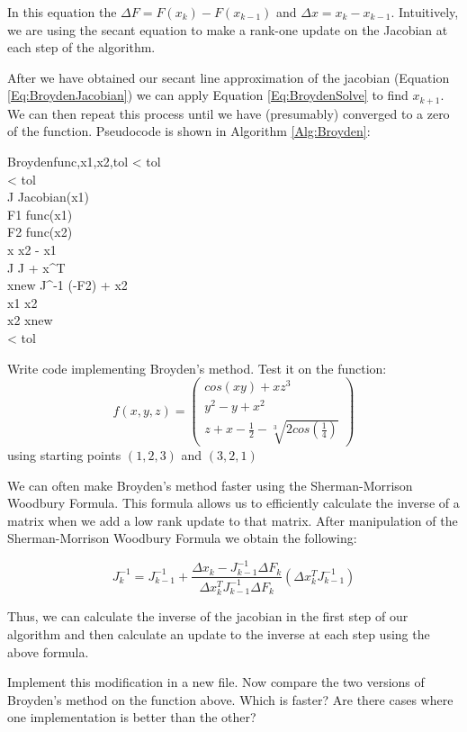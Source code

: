 In this equation the $\Delta F = F(x_k)-F(x_{k-1})$ and $\Delta x = x_k-x_{k-1}$. Intuitively, we are using the secant equation to make a rank-one update on the Jacobian at each step of the algorithm.

After we have obtained our secant line approximation of the jacobian (Equation \ref{Eq:BroydenJacobian}) we can apply Equation \ref{Eq:BroydenSolve} to find $x_{k+1}$. We can then repeat this process until we have (presumably) converged to a zero of the function. Pseudocode is shown in Algorithm \ref{Alg:Broyden}:

\begin{pseudo}{Broyden}{func,x1,x2,tol}
\label{Alg:Broyden}
\IF {} < tol \THEN
    \\
\IF {} < tol \THEN
    \\

J \GETS Jacobian(x1) \\

\REPEAT 
F1 \GETS func(x1) \\
F2 \GETS func(x2) \\
\Delta x \GETS x2 - x1 \\
J \GETS J + \Delta x^T \\
xnew \GETS J^{-1} (-F2) + x2 \\
x1 \GETS x2 \\
x2 \GETS xnew \\
\UNTIL {} < tol \THEN {}
\end{pseudo}

\begin{problem}
Write code implementing Broyden's method. Test it on the function:
\[
f(x,y,z) = 
 \left( \begin{array}{ccc}
cos(xy)+ xz^3 \\
y^2 - y + x^2 \\
z + x-\frac{1}{2}-\sqrt[3]{2cos(\frac{1}{4})} \end{array} \right)
\]
using starting points $(1,2,3)$ and $(3,2,1)$
\end{problem}

We can often make Broyden's method faster using the Sherman-Morrison Woodbury Formula. This formula allows us to efficiently calculate the inverse of a matrix when we add a low rank update to that matrix. After manipulation of the Sherman-Morrison Woodbury Formula we obtain the following:

\[
J_k^{-1} = J_{k-1}^{-1} + \frac{\Delta x_k - J_{k-1}^{-1}\Delta F_k}{\Delta x_k^T J_{k-1}^{-1}\Delta F_k} (\Delta x_k^T J_{k-1}^{-1})
\]

Thus, we can calculate the inverse of the jacobian in the first step of our algorithm and then calculate an update to the inverse at each step using the above formula.

\begin{problem}
Implement this modification in a new file. Now compare the two versions of Broyden's method on the function above. Which is faster? Are there cases where one implementation is better than the other?
\end{problem}
